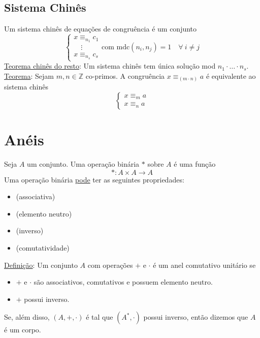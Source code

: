 \documentclass{article}
\begin{document}
\subsection{Sistema Chinês}
Um sistema chinês de equações de congruência é um conjunto
\[
  \begin{cases}
    x \equiv_{n_1} c_1 \\
    \quad \vdots \\
    x \equiv_{n_s} c_s
  \end{cases}
  \text{com mdc}(n_i, n_j) = 1 \quad \forall\: i \neq j
\]
\uline{Teorema chinês do resto}: Um sistema chinês tem única solução mod $n_1 \cdot \hdots \cdot n_s$. \\[10pt]
\uline{Teorema}: Sejam $m, n \in \mathbb{Z}$ co-primos. A congruência $x \equiv_{(m \cdot n)} a$ é equivalente ao sistema chinês
\[
  \begin{cases}
    x \equiv_m a \\
    x \equiv_n a
  \end{cases}
\]



\section{Anéis}
Seja $A$ um conjunto. Uma operação binária $*$ sobre $A$ é uma função
\[ *: A \times A \to A \]
Uma operação binária \uline{pode} ter as seguintes propriedades:
\begin{itemize}
  \item {} (associativa)
  \item {} (elemento neutro)
  \item {} (inverso)
  \item {} (comutatividade)
\end{itemize}
\vspace{10pt}
\uline{Definição}: Um conjunto $A$ com operações $+$ e $\cdot$ é um anel comutativo unitário se
\begin{itemize}
  \item $+$ e $\cdot$ são associativos, comutativos e possuem elemento neutro.
  \item $+$ possui inverso.
\end{itemize}
\vspace{5pt}
Se, além disso, $(A, +, \cdot)$ é tal que $(A^*, \cdot)$ possui inverso, então dizemos que $A$ é um corpo.
\end{document}
